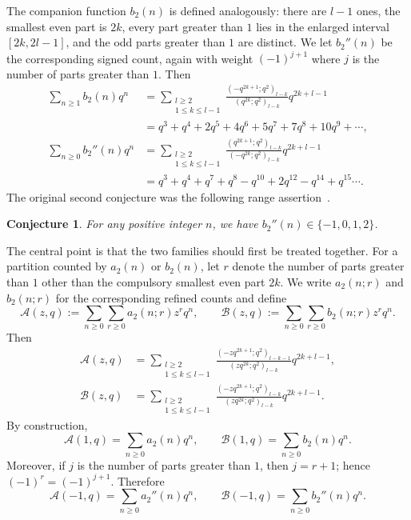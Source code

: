 \documentclass[reqno]{amsart}
\theoremstyle{definition}
\theoremstyle{plain}
\newtheorem{conjecture} {Conjecture}
\theoremstyle{remark}
\numberwithin{equation}{section}
\newcommand{\fr}{\frac}
\begin{document}
The companion function $b_2(n)$ is defined analogously: there are $l-1$ ones, the smallest even part is $2k$, every part greater than $1$ lies in the enlarged interval $[2k,2l-1]$, and the odd parts greater than $1$ are distinct. We let $b_2''(n)$ be the corresponding signed count, again with weight $(-1)^{j+1}$ where $j$ is the number of parts greater than $1$. Then
\begin{align*}
\sum_{n\geq 1} b_2(n) q^n &= \sum_{\substack{l\geq 2\\1\leq k\leq l-1}}\fr{(-q^{2k+1};q^2)_{l-k}}{(q^{2k};q^2)_{l-k}}q^{2k+l-1}\\
&=q^3 + q^4 + 2 q^5 + 4 q^6 + 5 q^7 + 7 q^8 + 10 q^9 +\cdots, \\
\sum_{n\geq 0} b_2''(n) q^n &= \sum_{\substack{l\geq 2 \\1\leq k \leq l-1}}\fr{(q^{2k+1};q^2)_{l-k}}{(-q^{2k};q^2)_{l-k}}q^{2k+l-1} \\
&= q^3 + q^4 + q^7 + q^8 - q^{10} + 2 q^{12} - q^{14} + q^{15} \cdots.
\end{align*}
The original second conjecture was the following range assertion~\cite[Conjecture 2]{Andrews-Bachraoui conjectures}.
\begin{conjecture}\label{conj2}
For any positive integer $n$, we have $b_2''(n)\in\{-1,0,1,2\}$.
\end{conjecture}

The central point is that the two families should first be treated together. For a partition counted by $a_2(n)$ or $b_2(n)$, let $r$ denote the number of parts greater than $1$ other than the compulsory smallest even part $2k$. We write $a_2(n;r)$ and $b_2(n;r)$ for the corresponding refined counts and define
\[
\mathcal A(z,q):=\sum_{n\ge 0}\sum_{r\ge 0} a_2(n;r)z^r q^n,\qquad
\mathcal B(z,q):=\sum_{n\ge 0}\sum_{r\ge 0} b_2(n;r)z^r q^n.
\]
Then
\begin{align}
\mathcal A(z,q)
&=\sum_{\substack{l\ge 2\\1\le k\le l-1}}
\frac{(-zq^{2k+1};q^2)_{l-k-1}}{(zq^{2k};q^2)_{l-k}}q^{2k+l-1}, \label{eq zA-def}\\
\mathcal B(z,q)
&=\sum_{\substack{l\ge 2\\1\le k\le l-1}}
\frac{(-zq^{2k+1};q^2)_{l-k}}{(zq^{2k};q^2)_{l-k}}q^{2k+l-1}. \label{eq zB-def}
\end{align}
By construction,
\[
\mathcal A(1,q)=\sum_{n\ge 0} a_2(n)q^n,\qquad \mathcal B(1,q)=\sum_{n\ge 0} b_2(n)q^n.
\]
Moreover, if $j$ is the number of parts greater than $1$, then $j=r+1$; hence $(-1)^r=(-1)^{j+1}$. Therefore
\[
\mathcal A(-1,q)=\sum_{n\ge 0} a_2''(n)q^n,\qquad
\mathcal B(-1,q)=\sum_{n\ge 0} b_2''(n)q^n.
\]
\end{document}
